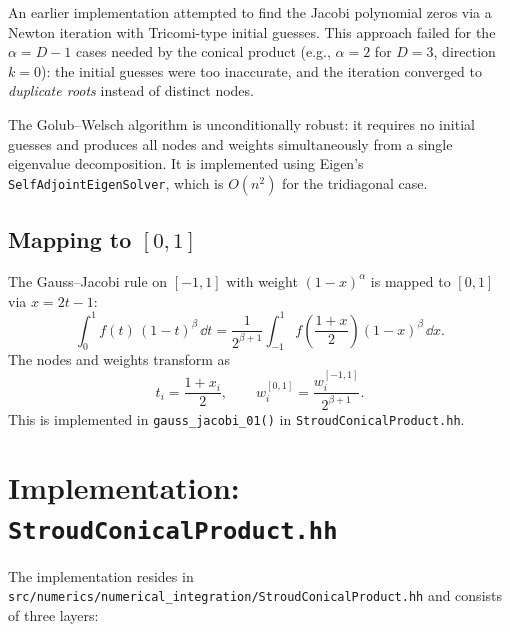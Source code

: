 \begin{remark}
An earlier implementation attempted to find the Jacobi polynomial zeros via a
Newton iteration with Tricomi-type initial guesses.  This approach failed for
the $\alpha = D-1$ cases needed by the conical product (e.g., $\alpha = 2$ for
$D = 3$, direction $k=0$): the initial guesses were too inaccurate, and the
iteration converged to \emph{duplicate roots} instead of distinct nodes.

The Golub--Welsch algorithm is unconditionally robust: it requires no initial
guesses and produces all nodes and weights simultaneously from a single
eigenvalue decomposition.  It is implemented using Eigen's
\texttt{SelfAdjointEigenSolver}, which is $O(n^2)$ for the tridiagonal case.
\end{remark}


\subsection{Mapping to $[0,1]$}

The Gauss--Jacobi rule on $[-1,1]$ with weight $(1-x)^\alpha$ is mapped to
$[0,1]$ via $x = 2t - 1$:
\begin{equation}
  \int_0^1 f(t)\,(1-t)^\beta\,\dd t
  = \frac{1}{2^{\beta+1}} \int_{-1}^{1} f\!\left(\frac{1+x}{2}\right)
    (1-x)^\beta\,\dd x.
  \label{eq:map_to_01}
\end{equation}
The nodes and weights transform as
\begin{equation}
  t_i = \frac{1 + x_i}{2}, \qquad
  w_i^{[0,1]} = \frac{w_i^{[-1,1]}}{2^{\beta+1}}.
  \label{eq:weight_map}
\end{equation}
This is implemented in \texttt{gauss\_jacobi\_01()} in
\texttt{StroudConicalProduct.hh}.


\section{Implementation: \texttt{StroudConicalProduct.hh}}
\label{sec:conical_impl}

The implementation resides in
\texttt{src/numerics/numerical\_integration/StroudConicalProduct.hh} and
consists of three layers:

